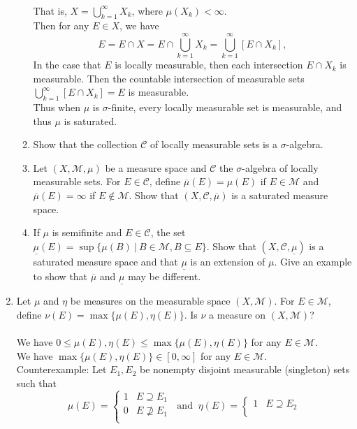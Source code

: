 \begin{enumerate}
\begin{enumerate}[label=(\roman*),align=left]
		\\That is, $X=\bigcup_{k=1}^\infty X_k$, where $\mu(X_k)<\infty$.
		\\Then for any $E\in X$, we have 
		\[
			E=E\cap X = E\cap \bigcup_{k=1}^\infty X_k = \bigcup_{k=1}^\infty[E\cap X_k],
		\]
		In the case that $E$ is locally measurable, then each intersection $E\cap X_k$ is measurable.
		Then the countable intersection of measurable sets $\bigcup_{k=1}^\infty[E\cap X_k]=E$ is measurable.
		\\Thus when $\mu$ is $\sigma$-finite, every locally measurable set is measurable, and thus $\mu$ is saturated.
		\item Show that the collection $\mathcal{C}$ of locally measurable sets is a $\sigma$-algebra.
		\item Let $(X,\mathcal{M},\mu)$ be a measure space and $\mathcal{C}$ the $\sigma$-algebra of locally measurable sets.
		For $E\in\mathcal{C}$, define $\overline\mu(E)=\mu(E)$ if $E\in\mathcal{M}$ and $\overline\mu(E)=\infty$ if $E\notin\mathcal{M}$.
		Show that $(X,\mathcal{C},\overline\mu)$ is a saturated measure space.
		\item If $\mu$ is semifinite and $E\in\mathcal{C}$, the set $\underline\mu(E)=\sup\{\mu(B)\ |\ B\in\mathcal{M},B\subseteq E\}$.
		Show that $(X,\mathcal{C},\underline\mu)$ is a saturated measure space and that $\underline\mu$ is an extension of $\mu$.
		Give an example to show that $\overline\mu$ and $\underline\mu$ may be different.
	\end{enumerate}
	\item Let $\mu$ and $\eta$ be measures on the measurable space $(X,\mathcal{M})$.
	For $E\in\mathcal{M}$, define $\nu(E)=\max\{\mu(E),\eta(E)\}$. Is $\nu$ a measure on $(X,\mathcal{M})$?\\
	\\We have $0\le\mu(E),\eta(E)\le\max\{\mu(E),\eta(E)\}$ for any $E\in\mathcal{M}$.
	\\We have $\max\{\mu(E),\eta(E)\}\in[0,\infty]$ for any $E\in\mathcal{M}$.
	\\Counterexample:
	Let $E_1,E_2$ be nonempty disjoint measurable (singleton) sets such that
	\[
		\mu(E)=
		\begin{cases}
			1&E\supseteq E_1\\
			0&E\not\supseteq E_1\\
		\end{cases}
		\ \text{ and }\ \eta(E)=
		\begin{cases}
			1&E\supseteq E_2\\

\end{cases}\]
\end{enumerate}
